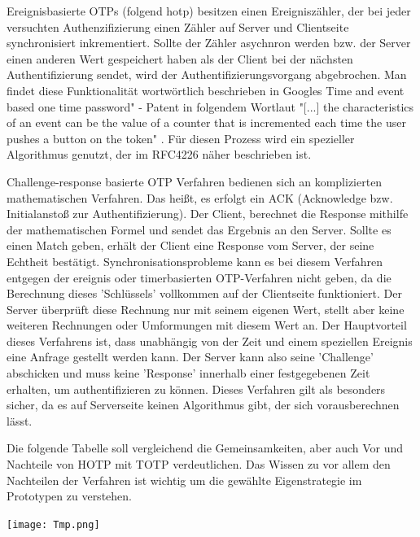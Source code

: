 Ereignisbasierte OTPs (folgend \ac{hotp}) besitzen einen Ereigniszähler, der bei jeder versuchten Authenzifizierung einen Zähler auf Server und Clientseite synchronisiert inkrementiert. Sollte der Zähler asychnron werden bzw. der Server einen anderen Wert gespeichert haben als der Client bei der nächsten Authentifizierung sendet, wird der Authentifizierungsvorgang abgebrochen. Man findet diese Funktionalität wortwörtlich beschrieben in Googles Time and event based one time password" - Patent \cite{A6} in folgendem Wortlaut "[...] the characteristics of an event can be the value of a counter that is incremented each time the user pushes a button on the token" \cite{A6}. Für diesen Prozess wird ein spezieller Algorithmus genutzt, der im RFC4226 näher beschrieben ist.

Challenge-response basierte OTP Verfahren bedienen sich an komplizierten mathematischen Verfahren. Das heißt, es erfolgt ein ACK (Acknowledge bzw. Initialanstoß zur Authentifizierung). Der Client, berechnet die Response mithilfe der mathematischen Formel und sendet das Ergebnis an den Server. Sollte es einen Match geben, erhält der Client eine Response vom Server, der seine Echtheit bestätigt. Synchronisationsprobleme kann es bei diesem Verfahren entgegen der ereignis oder timerbasierten OTP-Verfahren nicht geben, da die Berechnung dieses 'Schlüssels' vollkommen auf der Clientseite funktioniert. Der Server überprüft diese Rechnung nur mit seinem eigenen Wert, stellt aber keine weiteren Rechnungen oder Umformungen mit diesem Wert an. Der Hauptvorteil dieses Verfahrens ist, dass unabhängig von der Zeit und einem speziellen Ereignis eine Anfrage gestellt werden kann. Der Server kann also seine 'Challenge' abschicken und muss keine 'Response' innerhalb einer festgegebenen Zeit erhalten, um authentifizieren zu können. Dieses Verfahren gilt als besonders sicher, da es auf Serverseite keinen Algorithmus gibt, der sich vorausberechnen lässt.

Die folgende Tabelle soll vergleichend die Gemeinsamkeiten, aber auch Vor und Nachteile von HOTP mit TOTP verdeutlichen. Das Wissen zu vor allem den Nachteilen der Verfahren ist wichtig um die gewählte Eigenstrategie im Prototypen zu verstehen.

\texttt{[image: Tmp.png]}

